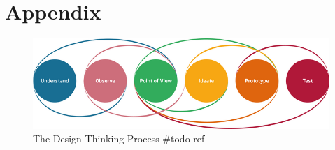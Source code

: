 \appendix %

    \renewcommand{\thetable}{\Alph{table}}
    \setcounter{table}{0}
    \renewcommand{\thefigure}{\Alph{figure}}
    \setcounter{figure}{0}

\section{Appendix}

\begin{figure}[h]
    \includegraphics[width=\textwidth]{img/DT_process.png}
    \caption{The Design Thinking Process \#todo ref}
    \label{fig:dt_process}
\end{figure} 

\blindtext